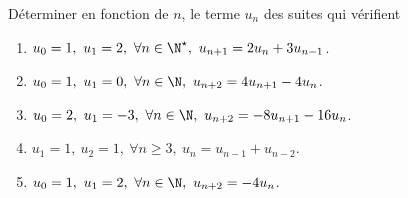 
\begin{exercice} \;
D\'eterminer en fonction de $n$, le terme $u_n$ des suites qui v\'erifient
\begin{enumerate}
 \item 
$u_0=1,\ u_1=2,\ \forall n\in\N^{\star},\ u_{n+1}=2u_n+3u_{n-1}$.
\item 
$u_0=1,\ u_1=0,\ \forall n\in\N,\ u_{n+2}=4u_{n+1}-4u_{n}$.
\item 
$u_0=2,\ u_1=-3,\ \forall n\in\N,\ u_{n+2}=-8u_{n+1}-16u_{n}$.
\item 
$u_1=1,\ u_2=1,\ \forall n\geq 3,\ u_{n}=u_{n-1}+u_{n-2}$.
\item 
$u_0=1,\ u_1=2,\ \forall n\in\N,\ u_{n+2}=-4u_{n}$.
\end{enumerate}
\end{exercice}